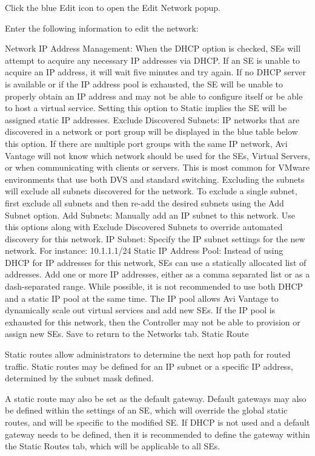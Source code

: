 \documentclass[letterpaper,10pt,english]{sphinxmanual}
\begin{document}
Click the blue Edit icon to open the Edit Network popup.

Enter the following information to edit the network:

Network IP Address Management: When the DHCP option is checked, SEs will attempt to acquire any necessary IP addresses via DHCP. If an SE is unable to acquire an IP address, it will wait five minutes and try again. If no DHCP server is available or if the IP address pool is exhausted, the SE will be unable to properly obtain an IP address and may not be able to configure itself or be able to host a virtual service. Setting this option to Static implies the SE will be assigned static IP addresses.
Exclude Discovered Subnets: IP networks that are discovered in a network or port group will be displayed in the blue table below this option. If there are multiple port groups with the same IP network, Avi Vantage will not know which network should be used for the SEs, Virtual Servers, or when communicating with clients or servers. This is most common for VMware environments that use both DVS and standard switching. Excluding the subnets will exclude all subnets discovered for the network. To exclude a single subnet, first exclude all subnets and then re-add the desired subnets using the Add Subnet option.
Add Subnets: Manually add an IP subnet to this network. Use this options along with Exclude Discovered Subnets to override automated discovery for this network.
IP Subnet: Specify the IP subnet settings for the new network. For instance: 10.1.1.1/24
Static IP Address Pool: Instead of using DHCP for IP addresses for this network, SEs can use a statically allocated list of addresses. Add one or more IP addresses, either as a comma separated list or as a dash-separated range. While possible, it is not recommended to use both DHCP and a static IP pool at the same time. The IP pool allows Avi Vantage to dynamically scale out virtual services and add new SEs. If the IP pool is exhausted for this network, then the Controller may not be able to provision or assign new SEs.
Save to return to the Networks tab.
Static Route

Static routes allow administrators to determine the next hop path for routed traffic. Static routes may be defined for an IP subnet or a specific IP address, determined by the subnet mask defined.

A static route may also be set as the default gateway. Default gateways may also be defined within the settings of an SE, which will override the global static routes, and will be specific to the modified SE. If DHCP is not used and a default gateway needs to be defined, then it is recommended to define the gateway within the Static Routes tab, which will be applicable to all SEs.
\end{document}
